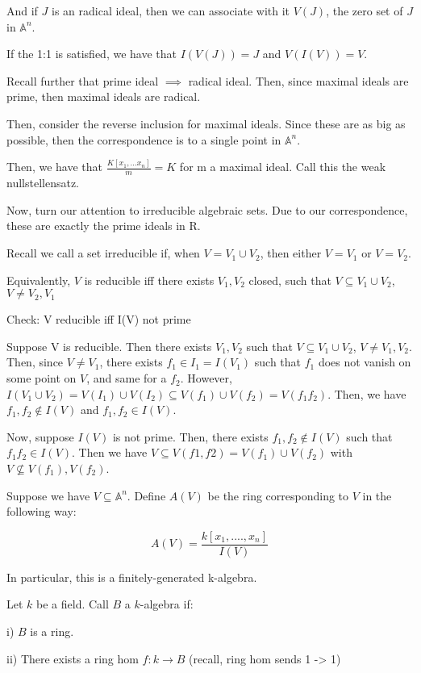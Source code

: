 \documentclass[10pt]{article}
\begin{document}
And if $J$ is an radical ideal, then we can associate with it $V(J)$, the zero set of $J$ in $\mathbb{A}^n$.

If the 1:1 is satisfied, we have that $I(V(J)) = J$ and $V(I(V)) = V$.

Recall further that prime ideal $\implies$ radical ideal. Then, since maximal ideals are prime, then maximal ideals are radical.

Then, consider the reverse inclusion for maximal ideals. Since these are as big as possible, then the correspondence is to a single point in $\mathbb{A}^n$.

Then, we have that $\frac{K[x_1,...x_n]}{m} = K$ for m a maximal ideal. Call this the weak nullstellensatz.

Now, turn our attention to irreducible algebraic sets. Due to our correspondence, these are exactly the prime ideals in R.

Recall we call a set irreducible if, when $V = V_1 \cup V_2$, then either $V = V_1$ or $V= V_2$.

Equivalently, $V$ is reducible iff there exists $V_1,V_2$ closed, such that $V \subseteq V_1 \cup V_2$, $V \not = V_2,V_1$

Check: V reducible iff I(V) not prime

Suppose V is reducible. Then there exists $V_1,V_2$ such that $V\subseteq V_1 \cup V_2$, $V\not=V_1,V_2$. Then, since $V \not =V_1$, there exists $f_1 \in I_1 = I(V_1)$ such that $f_1$ does not vanish on some point on $V$, and same for a $f_2$.  However, $I(V_1 \cup V_2) = V(I_1) \cup V(I_2) \subseteq V(f_1) \cup V(f_2) = V(f_1f_2)$. Then, we have $f_1, f_2 \not \in I(V)$ and $f_1,f_2 \in I(V)$.

Now, suppose $I(V)$ is not prime. Then, there exists $f_1,f_2 \not \in I(V)$ such that $f_1f_2 \in I(V)$. Then we have $V \subseteq V(f1,f2) = V(f_1) \cup V(f_2)$ with $V \not \subseteq V(f_1),V(f_2)$.

Suppose we have $V \subseteq \mathbb{A}^n$. Define $A(V)$ be the ring corresponding to $V$ in the following way:

$$ A(V) = \frac{k[x_1,....,x_n]}{I(V)} $$

In particular, this is a finitely-generated k-algebra.

Let $k$ be a field. Call $B$ a $k$-algebra if:

i) $B$ is a ring.

ii) There exists a ring hom $f: k \rightarrow B$ (recall, ring hom sends 1 -> 1)
\end{document}
